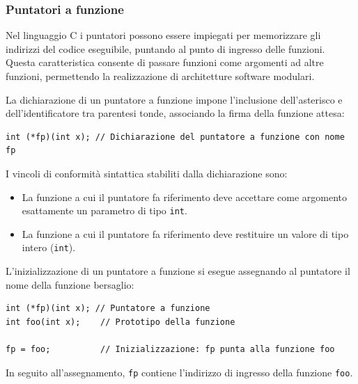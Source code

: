 \subsubsection{Puntatori a funzione}
Nel linguaggio C i puntatori possono essere impiegati per memorizzare gli indirizzi del codice eseguibile, puntando al punto di ingresso delle funzioni. Questa caratteristica consente di passare funzioni come argomenti ad altre funzioni, permettendo la realizzazione di architetture software modulari.

La dichiarazione di un puntatore a funzione impone l'inclusione dell'asterisco e dell'identificatore tra parentesi tonde, associando la firma della funzione attesa:
\begin{verbatim}
int (*fp)(int x); // Dichiarazione del puntatore a funzione con nome fp
\end{verbatim}

I vincoli di conformità sintattica stabiliti dalla dichiarazione sono:
\begin{itemize}
	\item La funzione a cui il puntatore fa riferimento deve accettare come argomento esattamente un parametro di tipo \texttt{int}.
	\item La funzione a cui il puntatore fa riferimento deve restituire un valore di tipo intero (\texttt{int}).
\end{itemize}

L'inizializzazione di un puntatore a funzione si esegue assegnando al puntatore il nome della funzione bersaglio:
\begin{verbatim}
int (*fp)(int x); // Puntatore a funzione
int foo(int x);    // Prototipo della funzione

fp = foo;          // Inizializzazione: fp punta alla funzione foo
\end{verbatim}
In seguito all'assegnamento, \texttt{fp} contiene l'indirizzo di ingresso della funzione \texttt{foo}.
